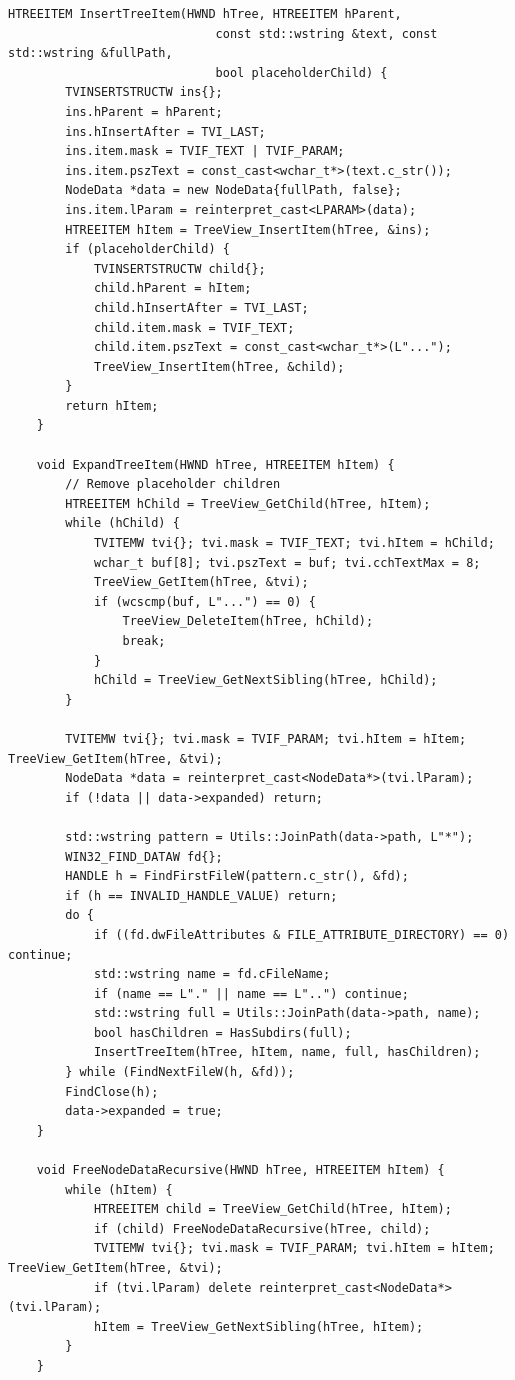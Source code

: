 \begin{lstlisting}[style=CodeListing]
    HTREEITEM InsertTreeItem(HWND hTree, HTREEITEM hParent, 
                             const std::wstring &text, const std::wstring &fullPath, 
                             bool placeholderChild) {
        TVINSERTSTRUCTW ins{};
        ins.hParent = hParent;
        ins.hInsertAfter = TVI_LAST;
        ins.item.mask = TVIF_TEXT | TVIF_PARAM;
        ins.item.pszText = const_cast<wchar_t*>(text.c_str());
        NodeData *data = new NodeData{fullPath, false};
        ins.item.lParam = reinterpret_cast<LPARAM>(data);
        HTREEITEM hItem = TreeView_InsertItem(hTree, &ins);
        if (placeholderChild) {
            TVINSERTSTRUCTW child{};
            child.hParent = hItem;
            child.hInsertAfter = TVI_LAST;
            child.item.mask = TVIF_TEXT;
            child.item.pszText = const_cast<wchar_t*>(L"...");
            TreeView_InsertItem(hTree, &child);
        }
        return hItem;
    }
    
    void ExpandTreeItem(HWND hTree, HTREEITEM hItem) {
        // Remove placeholder children
        HTREEITEM hChild = TreeView_GetChild(hTree, hItem);
        while (hChild) {
            TVITEMW tvi{}; tvi.mask = TVIF_TEXT; tvi.hItem = hChild;
            wchar_t buf[8]; tvi.pszText = buf; tvi.cchTextMax = 8;
            TreeView_GetItem(hTree, &tvi);
            if (wcscmp(buf, L"...") == 0) {
                TreeView_DeleteItem(hTree, hChild);
                break;
            }
            hChild = TreeView_GetNextSibling(hTree, hChild);
        }

        TVITEMW tvi{}; tvi.mask = TVIF_PARAM; tvi.hItem = hItem; TreeView_GetItem(hTree, &tvi);
        NodeData *data = reinterpret_cast<NodeData*>(tvi.lParam);
        if (!data || data->expanded) return;

        std::wstring pattern = Utils::JoinPath(data->path, L"*");
        WIN32_FIND_DATAW fd{};
        HANDLE h = FindFirstFileW(pattern.c_str(), &fd);
        if (h == INVALID_HANDLE_VALUE) return;
        do {
            if ((fd.dwFileAttributes & FILE_ATTRIBUTE_DIRECTORY) == 0) continue;
            std::wstring name = fd.cFileName;
            if (name == L"." || name == L"..") continue;
            std::wstring full = Utils::JoinPath(data->path, name);
            bool hasChildren = HasSubdirs(full);
            InsertTreeItem(hTree, hItem, name, full, hasChildren);
        } while (FindNextFileW(h, &fd));
        FindClose(h);
        data->expanded = true;
    }
    
    void FreeNodeDataRecursive(HWND hTree, HTREEITEM hItem) {
        while (hItem) {
            HTREEITEM child = TreeView_GetChild(hTree, hItem);
            if (child) FreeNodeDataRecursive(hTree, child);
            TVITEMW tvi{}; tvi.mask = TVIF_PARAM; tvi.hItem = hItem; TreeView_GetItem(hTree, &tvi);
            if (tvi.lParam) delete reinterpret_cast<NodeData*>(tvi.lParam);
            hItem = TreeView_GetNextSibling(hTree, hItem);
        }
    }
    

\end{lstlisting}
